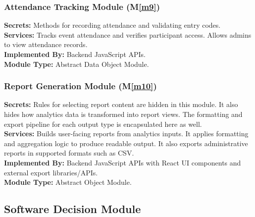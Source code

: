 \documentclass[12pt, titlepage]{article}
\newcommand{\mref}[1]{M\ref{#1}}
\begin{document}
\subsubsection{Attendance Tracking Module (\mref{m9})}
\textbf{Secrets:} Methods for recording attendance and validating entry codes.\\
\textbf{Services:} Tracks event attendance and verifies participant access. Allows admins to view attendance records.\\
\textbf{Implemented By:} Backend JavaScript APIs.\\
\textbf{Module Type:} Abstract Data Object Module.

\subsubsection{Report Generation Module (\mref{m10})}
\textbf{Secrets:} Rules for selecting report content are hidden in this module. It also hides how analytics data is transformed into report views. The formatting and export pipeline for each output type is encapsulated here as well.\\
\textbf{Services:} Builds user-facing reports from analytics inputs. It applies formatting and aggregation logic to produce readable output. It also exports administrative reports in supported formats such as CSV.\\
\textbf{Implemented By:} Backend JavaScript APIs with React UI components and external export libraries/APIs.\\
\textbf{Module Type:} Abstract Object Module.

\subsection{Software Decision Module}

\end{document}
